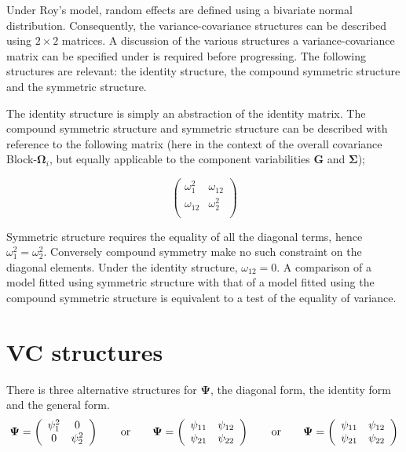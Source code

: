 \documentclass[12pt, a4paper]{report}
\theoremstyle{plain}
\theoremstyle{definition}
\theoremstyle{remark}
\begin{document}
	Under Roy's model, random effects are defined using a bivariate normal distribution. Consequently, the variance-covariance structures can be described using $2 \times 2$  matrices. A discussion of the various structures a variance-covariance matrix can be specified under is required before progressing. The following structures are relevant: the identity structure, the compound symmetric structure and the symmetric structure.
	
	The identity structure is simply an abstraction of the identity matrix. The compound symmetric structure and symmetric structure can be described with reference to the following matrix (here in the context of the overall covariance Block-$\boldsymbol{\Omega}_i$, but equally applicable to the component variabilities $\boldsymbol{G}$ and $\boldsymbol{\Sigma}$);
	
	\[\left( \begin{array}{cc}
	\omega^2_1  & \omega_{12} \\
	\omega_{12} & \omega^2_2 \\
	\end{array}\right) \]
	
	Symmetric structure requires the equality of all the diagonal terms, hence $\omega^2_1 = \omega^2_2$. Conversely compound symmetry make no such constraint on the diagonal elements. Under the identity structure, $\omega_{12} = 0$.
	A comparison of a model fitted using symmetric structure with that of a model fitted using the compound symmetric structure is equivalent to a test of the equality of variance.
	
	

	
\section{VC structures}
	
	There is three alternative structures for
	$\boldsymbol{\Psi}$, the diagonal form, the identity form and the general form.
	\[
	\boldsymbol{\Psi} =
	\left(%
	\begin{array}{c c}
	\psi^2_1 & 0  \\
	0 & \psi^2_2  \\
	\end{array}%
	\right)\qquad \mathrm{or} \qquad \boldsymbol{\Psi} =
	\left(%
	\begin{array}{c c}
	\psi_{11} & \psi_{12}  \\
	\psi_{21} & \psi_{22}  \\
	\end{array}%
	\right)
	\qquad \mathrm{or} \qquad \boldsymbol{\Psi} =
	\left(%
	\begin{array}{c c}
	\psi_{11} & \psi_{12}  \\
	\psi_{21} & \psi_{22}  \\
	\end{array}%
	\right)
	\]
	
\end{document}
